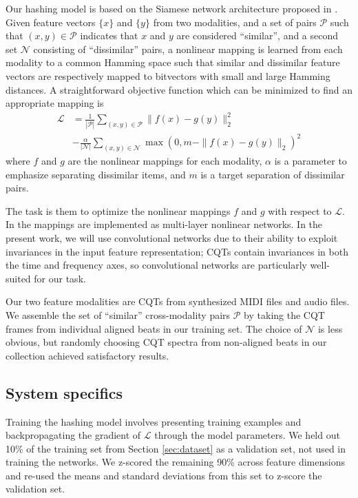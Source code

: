 \documentclass{article}
\begin{document}
Our hashing model is based on the Siamese network architecture proposed in \cite{masci2014multimodal}.
Given feature vectors $\{x\}$ and $\{y\}$ from two modalities, and a set of pairs $\mathcal{P}$ such that $(x, y) \in \mathcal{P}$ indicates that $x$ and $y$ are considered ``similar'', and a second set $\mathcal{N}$ consisting of ``dissimilar'' pairs, a nonlinear mapping is learned from each modality to a common Hamming space such that similar and dissimilar feature vectors are respectively mapped to bitvectors with small and large Hamming distances.
A straightforward objective function which can be minimized to find an appropriate mapping is
\begin{align*}
\mathcal{L} &= \frac{1}{|\mathcal{P}|} \sum_{(x, y) \in \mathcal{P}} \| f(x) - g(y) \|_2^2\\
& - \frac{\alpha}{|\mathcal{N}|} \sum_{(x, y) \in \mathcal{N}} \max(0, m - \|f(x) - g(y) \|_2)^2
\end{align*}
where $f$ and $g$ are the nonlinear mappings for each modality, $\alpha$ is a parameter to emphasize separating dissimilar items, and $m$ is a target separation of dissimilar pairs.

The task is them to optimize the nonlinear mappings $f$ and $g$ with respect to $\mathcal{L}$. 
In \cite{masci2014multimodal} the mappings are implemented as multi-layer nonlinear networks.
In the present work, we will use convolutional networks due to their ability to exploit invariances in the input feature representation; CQTs contain invariances in both the time and frequency axes, so convolutional networks are particularly well-suited for our task.

Our two feature modalities are CQTs from synthesized MIDI files and audio files.
We assemble the set of ``similar'' cross-modality pairs $\mathcal{P}$ by taking the CQT frames from individual aligned beats in our training set.
The choice of $\mathcal{N}$ is less obvious, but randomly choosing CQT spectra from non-aligned beats in our collection achieved satisfactory results.

\subsection{System specifics}

Training the hashing model involves presenting training examples and backpropagating the gradient of $\mathcal{L}$ through the model parameters.
We held out 10\% of the training set from Section \ref{sec:dataset} as a validation set, not used in training the networks.
We z-scored the remaining 90\% across feature dimensions and re-used the means and standard deviations from this set to z-score the validation set.
\end{document}
